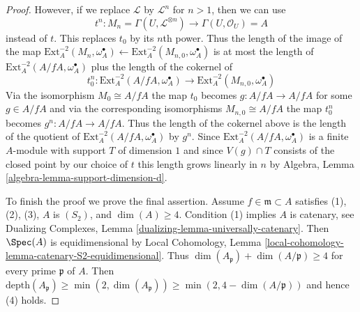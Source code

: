 \begin{proof}
\medskip\noindent
However, if we replace $\mathcal{L}$ by $\mathcal{L}^n$ for $n > 1$,
then we can use
$$
t^n :
M_n = \Gamma(U, \mathcal{L}^{\otimes n})
\longrightarrow
\Gamma(U, \mathcal{O}_U) = A
$$
instead of $t$. This replaces $t_0$ by its $n$th power.
Thus the length of the image of the map
$\text{Ext}^{-2}_A(M_n, \omega_A^\bullet) \leftarrow
\text{Ext}^{-2}_A(M_{n, 0}, \omega_A^\bullet)$
is at most the length of $\text{Ext}^{-2}_A(A/fA, \omega_A^\bullet)$
plus the length of the cokernel of
$$
t_0^n :
\text{Ext}^{-2}_A(A/fA, \omega_A^\bullet)
\longrightarrow
\text{Ext}^{-2}_A(M_{n, 0}, \omega_A^\bullet)
$$
Via the isomorphism $M_0 \cong A/fA$ the map $t_0$ becomes
$g : A/fA \to A/fA$ for some $g \in A/fA$ and via the corresponding
isomorphisms $M_{n, 0} \cong A/fA$ the map $t_0^n$ becomes
$g^n : A/fA \to A/fA$. Thus the length of the cokernel above
is the length of the quotient of
$\text{Ext}^{-2}_A(A/fA, \omega_A^\bullet)$ by $g^n$.
Since $\text{Ext}^{-2}_A(A/fA, \omega_A^\bullet)$ is a finite $A$-module
with support $T$ of dimension $1$ and since $V(g) \cap T$
consists of the closed point by our choice of $t$
this length grows linearly in $n$ by
Algebra, Lemma \ref{algebra-lemma-support-dimension-d}.

\medskip\noindent
To finish the proof we prove the final assertion. Assume
$f \in \mathfrak m \subset A$ satisfies
(1), (2), (3), $A$ is $(S_2)$, and $\dim(A) \geq 4$.
Condition (1) implies $A$ is catenary, see
Dualizing Complexes, Lemma \ref{dualizing-lemma-universally-catenary}.
Then $\Spec(A)$ is equidimensional by Local Cohomology, Lemma
\ref{local-cohomology-lemma-catenary-S2-equidimensional}.
Thus $\dim(A_\mathfrak p) + \dim(A/\mathfrak p) \geq 4$
for every prime $\mathfrak p$ of $A$. Then
$\text{depth}(A_\mathfrak p) \geq \min(2, \dim(A_\mathfrak p))
\geq \min(2, 4 - \dim(A/\mathfrak p))$ and hence (4) holds.
\end{proof}

